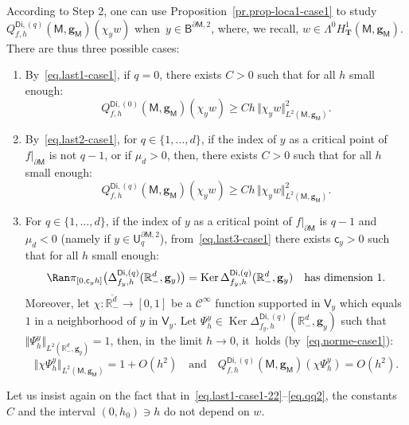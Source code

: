 \documentclass[10pt]{amsart}
\newcommand{\quand}{\quad\text{and}\quad}
\newcommand{\mbf}[1]{\mathbf{#1}}
\let\pa\partial
\DeclareMathOperator\Ker{Ker}
\theoremstyle{plain}
\theoremstyle{definition}
\begin{document}
According to Step 2, one can use Proposition~\ref{pr.prop-loca1-case1}
to study $Q_{f,h}^{\mathsf{Di},(q)}(\mathsf M,\mbf g_{\mathsf M})(\chi_y w)$ when~$y\in \mathsf B^{\pa \mathsf M,2}$, where, we
recall, $w\in \Lambda^0H^1_{\mbf T}(\mathsf M,\mbf g_{\mathsf M})$. There are thus three possible cases:
\begin{enumerate}
\item\label{step:31}
By~\eqref{eq.last1-case1}, if $q=0$, there exists $C>0$ such that for all $h$ small enough:
\begin{equation}\label{eq.last1-case1-22}
Q_{f,h}^{\mathsf{Di},(0)}(\mathsf M,\mbf g_{\mathsf M})(\chi_y w)\ge Ch\, \Vert \chi_y w \Vert_{L^2(\mathsf M,\mbf g_{\mathsf M})}^2.
\end{equation}
\item\label{step:32}
By~\eqref{eq.last2-case1}, for $q\in \{1,\ldots,d\}$, if the
index of $y$ as a critical point of $f|_{\pa \mathsf M}$ is not $q-1$, or if $\mu_{d}>0$, then, there exists $C>0$ such that for all $h$ small enough:
\begin{equation}\label{eq.qq2}
Q_{f,h}^{\mathsf{Di},(q)}(\mathsf M,\mbf g_{\mathsf M})(\chi_y w)\ge Ch\, \Vert\chi_y w \Vert_{L^2(\mathsf M,\mbf g_{\mathsf M})}^2.
\end{equation}

\item\label{step:33}
For $q\in \{1,\ldots,d\}$, if the index of $y$ as a critical point of
$f|_{\pa \mathsf M}$ is $q-1$ and $\mu_{d}<0$ (namely if $y \in \mathsf U^{\pa \mathsf M,2}_q$),
from~\eqref{eq.last3-case1} there exists $\mathsf c_y>0$ such that
for all $h$ small enough:
\begin{equation}\label{eq.span=11}
\Ran \pi_{[0,\mathsf c_yh]}\bigl(\Delta_{f_y,h}^{\mathsf{Di},(q)}(\mathbb R_-^d,\mbf g_y)\bigr)=\Ker \Delta_{f_y,h}^{\mathsf{Di},(q)}(\mathbb R_-^d,\mbf g_y)\quad \text{has dimension } 1.
\end{equation}
Moreover, let $\chi: \overline{\mathbb R^{d}_-}\to [0,1]$ be a $\mathcal C^\infty$ function supported in $\mathsf V_y$ which equals~$1$ in a neighborhood of $y$ in $\mathsf V_y$.
Let $\Psi_h^y\in \Ker \Delta_{f_y,h}^{\mathsf{Di},(q)}(\mathbb R_-^d,\mbf g_y)$ such that $\Vert \Psi_h^y \Vert_{L^2(\mathbb R^d_-,\mbf g_y)}=1$, then, in~the limit $h\to 0$, it~holds (by~\eqref{eq.norme-case1}):
\begin{equation}\label{eq.norme-case1-2}
\Vert \chi \Psi_h^y \Vert_{L^2(\mathsf M,\mbf g_{\mathsf M})} =1+O (h^{2}) \quand Q_{f,h}^{\mathsf{Di},(q)}(\mathsf M,\mbf g_{\mathsf M})(\chi \Psi_h^y)=O(h^2).
\end{equation}
\end{enumerate}
Let us insist again on the fact that in~\eqref{eq.last1-case1-22}--\eqref{eq.qq2}, the constants $C$
and the interval $(0,h_0) \ni h$ do not depend on $w$.
\end{document}
